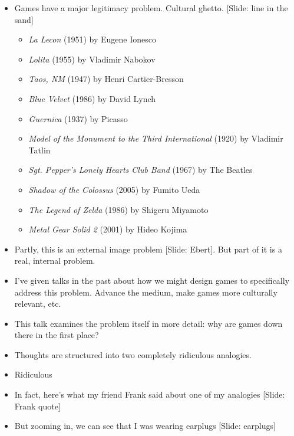 \documentclass[12pt]{article}
\begin{document}
{\Huge

\begin{itemize}



\item Games have a major legitimacy problem.  Cultural ghetto.  [Slide:  line in the sand] {\large \begin{itemize}
\item {\it La Lecon} (1951) by Eugene Ionesco
\item {\it Lolita} (1955) by Vladimir Nabokov
\item {\it Taos, NM} (1947) by Henri Cartier-Bresson
\item {\it Blue Velvet} (1986) by David Lynch
\item {\it Guernica} (1937) by Picasso
\item {\it Model of the Monument to the Third International} (1920) by Vladimir Tatlin
\item {\it Sgt. Pepper's Lonely Hearts Club Band} (1967) by The Beatles
\item {\it Shadow of the Colossus} (2005) by Fumito Ueda
\item {\it The Legend of Zelda} (1986) by Shigeru Miyamoto
\item {\it Metal Gear Solid 2} (2001) by Hideo Kojima 
\end{itemize} }

\item Partly, this is an external image problem [Slide:  Ebert].  But part of it is a real, internal problem.

\item I've given talks in the past about how we might design games to specifically address this problem.  Advance the medium, make games more culturally relevant, etc.

\item This talk examines the problem itself in more detail:  why are games down there in the first place?

\item Thoughts are structured into two completely ridiculous analogies.

\item Ridiculous 

\item In fact, here's what my friend Frank said about one of my analogies [Slide:  Frank quote]

\item But zooming in, we can see that I was wearing earplugs [Slide:  earplugs]
 

\end{itemize}}
\end{document}
